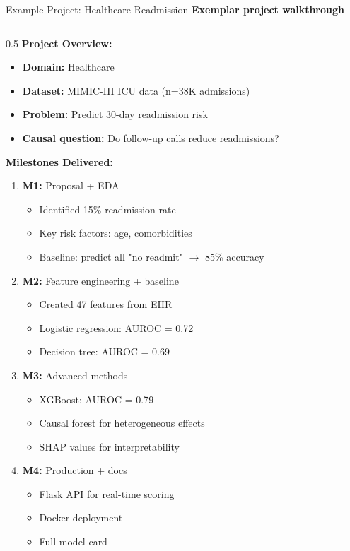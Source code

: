 \begin{frame}{Example Project: Healthcare Readmission}
\textbf{Exemplar project walkthrough}

\begin{columns}
\begin{column}{0.5\textwidth}
\textbf{Project Overview:}

\begin{itemize}
\item \textbf{Domain:} Healthcare
\item \textbf{Dataset:} MIMIC-III ICU data (n=38K admissions)
\item \textbf{Problem:} Predict 30-day readmission risk
\item \textbf{Causal question:} Do follow-up calls reduce readmissions?
\end{itemize}

\vspace{0.2cm}

\textbf{Milestones Delivered:}

\begin{enumerate}
\item \textbf{M1:} Proposal + EDA
   \begin{itemize}
   \item Identified 15\% readmission rate
   \item Key risk factors: age, comorbidities
   \item Baseline: predict all "no readmit" $\to$ 85\% accuracy
   \end{itemize}

\item \textbf{M2:} Feature engineering + baseline
   \begin{itemize}
   \item Created 47 features from EHR
   \item Logistic regression: AUROC = 0.72
   \item Decision tree: AUROC = 0.69
   \end{itemize}

\item \textbf{M3:} Advanced methods
   \begin{itemize}
   \item XGBoost: AUROC = 0.79
   \item Causal forest for heterogeneous effects
   \item SHAP values for interpretability
   \end{itemize}

\item \textbf{M4:} Production + docs
   \begin{itemize}
   \item Flask API for real-time scoring
   \item Docker deployment
   \item Full model card
   \end{itemize}
\end{enumerate}
\end{column}


\end{columns}
\end{frame}
